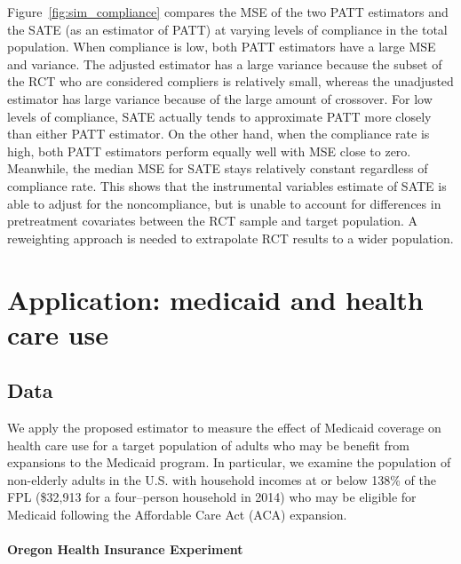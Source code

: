 \documentclass[12pt]{article}
\begin{document}

Figure~\ref{fig:sim_compliance} compares the MSE of the two PATT estimators and the SATE (as an estimator of PATT) at varying levels of compliance in the total population.  When compliance is low, both PATT estimators have a large MSE and variance.  The adjusted estimator has a large variance because the subset of the RCT who are considered compliers is relatively small, whereas the unadjusted estimator has large variance because of the large amount of crossover.  For low levels of compliance, SATE actually tends to approximate PATT more closely than either PATT estimator.  On the other hand, when the compliance rate is high, both PATT estimators perform equally well with MSE close to zero.  Meanwhile, the median MSE for SATE stays relatively constant regardless of compliance rate.  This shows that the instrumental variables estimate of SATE is able to adjust for the noncompliance, but is unable to account for differences in pretreatment covariates between the RCT sample and target population. A reweighting approach is needed to extrapolate RCT results to a wider population.


\section{Application: medicaid and health care use}
\subsection{Data} \label{data}

We apply the proposed estimator to measure the effect of Medicaid coverage on health care use for a target population of adults who may be benefit from expansions to the Medicaid program. In particular, we examine the population of non-elderly adults in the U.S. with household incomes at or below 138\% of the FPL (\$32,913 for a four--person household in 2014) who may be eligible for Medicaid following the Affordable Care Act (ACA) expansion.

\paragraph{Oregon Health Insurance Experiment}
\end{document}
